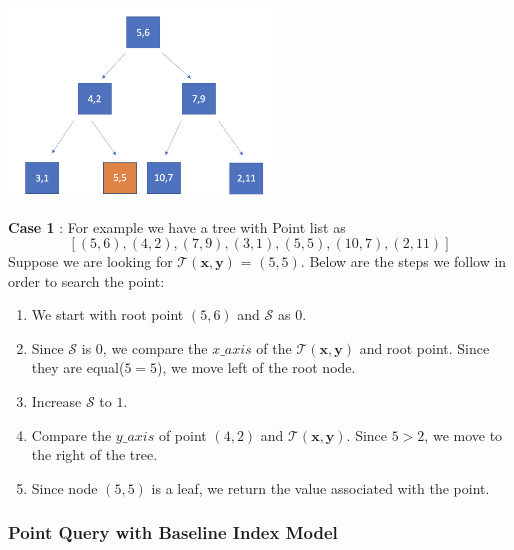 \begin{mscexample}
    \begin{minipage}[t]{\linewidth}
        \centering
        \includegraphics[width=7cm]{graphs/KD_Tree_Point_Query_Tree.png}
        \label{fig:$K$D-Tree_for_Point Query}
    \end{minipage}
    
    \textbf{Case 1} : For example we have a tree with Point list as 
	$$[(5,6),(4,2),(7,9),(3,1),(5,5),(10,7),(2,11)]$$
    Suppose we are looking for $\mathcal{T}(\boldsymbol{x}, \boldsymbol{y})$ = $(5,5)$.
    Below are the steps we follow in order to search the point:
    \begin{enumerate}
         \item We start with root point $(5,6)$ and $\mathcal{S}$ as $0$. 
         
         \item Since $\mathcal{S}$ is $0$, we compare the $x\_axis$ of the $\mathcal{T}(\boldsymbol{x}, \boldsymbol{y})$ and root point. Since they are equal($5 = 5$), we move left of the root node. 
         
         \item Increase $\mathcal{S}$ to $1$. 
         
         \item Compare the $y\_axis$ of point $(4,2)$ and  $\mathcal{T}(\boldsymbol{x}, \boldsymbol{y})$. Since $5 > 2$, we move to the right of the tree. 
         
         \item Since node $(5,5)$ is a leaf, we return the value associated with the point. 
    \end{enumerate}
\end{mscexample}

\subsubsection{Point Query with Baseline Index Model}

